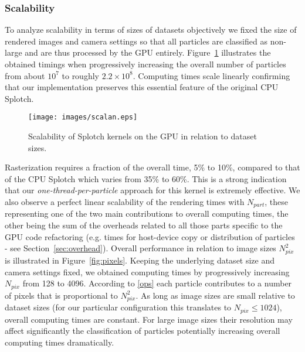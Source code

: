 \documentclass[1p]{elsarticle}
\begin{document}
\subsubsection{Scalability}
\label{sec:scalability}
To analyze scalability in terms of sizes of datasets objectively we fixed the size of rendered images and camera settings so that all particles are classified as non-large and are thus processed by the GPU entirely. 
Figure~\ref{fig:scalability} illustrates the obtained timings when progressively increasing the overall number of particles
from about $10^7$ to roughly $2.2\times 10^8$. Computing times scale linearly confirming that our implementation preserves this essential feature of the original CPU Splotch. 
\begin{figure}
\centering
\texttt{[image: images/scalan.eps]}
\caption{Scalability of Splotch kernels on the GPU in relation to dataset sizes.}
\label{fig:scalability}
\end{figure}
Rasterization requires a fraction of the overall time, 5\% to 10\%, compared to that of the CPU Splotch which varies from 35\% to 60\%. This is a strong indication that our {\it one-thread-per-particle} approach for this kernel is extremely effective. We also observe a perfect linear scalability of the rendering times with $N_{part}$, these representing one of the two main contributions to overall computing times, the other being the sum of the overheads related to all those parts specific to the GPU code refactoring (e.g. times for host-device copy or distribution of particles - see Section~\ref{sec:overhead}). 
Overall performance in relation to image sizes $N_{pix}^2$ is illustrated in Figure~\ref{fig:pixels}. Keeping the underlying dataset size and camera settings fixed, we obtained computing times by progressively increasing
$N_{pix}$ from 128 to 4096. According to \eqref{ops} each particle contributes to a number of pixels that is proportional to $N_{pix}^{2}$. As long as image sizes are small relative to dataset sizes (for our particular configuration this translates to $N_{pix} \le 1024$), overall computing times are constant. For large image sizes their resolution may affect significantly the classification of particles potentially increasing overall computing times dramatically.
\end{document}
